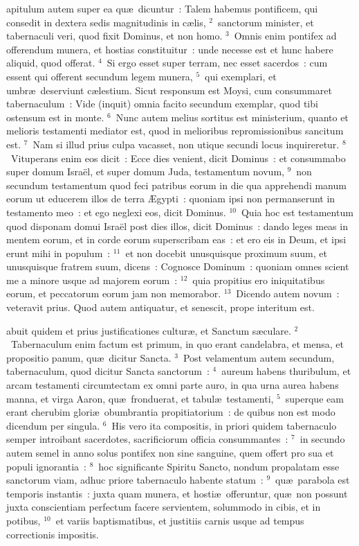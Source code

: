 \bchapter
{}apitulum autem super ea qu\ae\ dicuntur~: Talem habemus pontificem, qui consedit in dextera sedis magnitudinis in c\ae lis,
${}^{2}$~sanctorum minister, et tabernaculi veri, quod fixit Dominus, et non homo.
${}^{3}$~Omnis enim pontifex ad offerendum munera, et hostias constituitur~: unde necesse est et hunc habere aliquid, quod offerat.
${}^{4}$~Si ergo esset super terram, nec esset sacerdos~: cum essent qui offerent secundum legem munera,
${}^{5}$~qui exemplari, et umbr\ae\ deserviunt c\ae lestium. Sicut responsum est Moysi, cum consummaret tabernaculum~: Vide (inquit) omnia facito secundum exemplar, quod tibi ostensum est in monte.
${}^{6}$~Nunc autem melius sortitus est ministerium, quanto et melioris testamenti mediator est, quod in melioribus repromissionibus sancitum est.
${}^{7}$~Nam si illud prius culpa vacasset, non utique secundi locus inquireretur.
${}^{8}$~Vituperans enim eos dicit~: Ecce dies venient, dicit Dominus~: et consummabo super domum Isra\"el, et super domum Juda, testamentum novum,
${}^{9}$~non secundum testamentum quod feci patribus eorum in die qua apprehendi manum eorum ut educerem illos de terra \AE gypti~: quoniam ipsi non permanserunt in testamento meo~: et ego neglexi eos, dicit Dominus.
${}^{10}$~Quia hoc est testamentum quod disponam domui Isra\"el post dies illos, dicit Dominus~: dando leges meas in mentem eorum, et in corde eorum superscribam eas~: et ero eis in Deum, et ipsi erunt mihi in populum~:
${}^{11}$~et non docebit unusquisque proximum suum, et unusquisque fratrem suum, dicens~: Cognosce Dominum~: quoniam omnes scient me a minore usque ad majorem eorum~:
${}^{12}$~quia propitius ero iniquitatibus eorum, et peccatorum eorum jam non memorabor.
${}^{13}$~Dicendo autem novum~: veteravit prius. Quod autem antiquatur, et senescit, prope interitum est.

\bchapter
{}abuit quidem et prius justificationes cultur\ae , et Sanctum s\ae culare.
${}^{2}$~Tabernaculum enim factum est primum, in quo erant candelabra, et mensa, et propositio panum, qu\ae\ dicitur Sancta.
${}^{3}$~Post velamentum autem secundum, tabernaculum, quod dicitur Sancta sanctorum~:
${}^{4}$~aureum habens thuribulum, et arcam testamenti circumtectam ex omni parte auro, in qua urna aurea habens manna, et virga Aaron, qu\ae\ fronduerat, et tabul\ae\ testamenti,
${}^{5}$~superque eam erant cherubim glori\ae\ obumbrantia propitiatorium~: de quibus non est modo dicendum per singula.
${}^{6}$~His vero ita compositis, in priori quidem tabernaculo semper introibant sacerdotes, sacrificiorum officia consummantes~:
${}^{7}$~in secundo autem semel in anno solus pontifex non sine sanguine, quem offert pro sua et populi ignorantia~:
${}^{8}$~hoc significante Spiritu Sancto, nondum propalatam esse sanctorum viam, adhuc priore tabernaculo habente statum~:
${}^{9}$~qu\ae\ parabola est temporis instantis~: juxta quam munera, et hosti\ae\ offeruntur, qu\ae\ non possunt juxta conscientiam perfectum facere servientem, solummodo in cibis, et in potibus,
${}^{10}$~et variis baptismatibus, et justitiis carnis usque ad tempus correctionis impositis.


